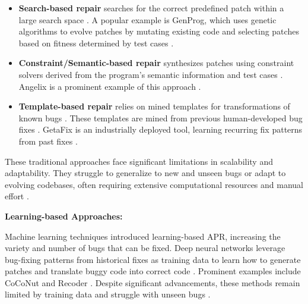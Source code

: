 \begin{itemize}
    \item \textbf{Search-based repair} searches for the correct predefined patch within a large search space \cite{liuMarsCodeAgentAInative2024, huCanGPTO1Kill2024, zhangPATCHEmpoweringLarge2025}. A popular example is GenProg, which uses genetic algorithms to evolve patches by mutating existing code and selecting patches based on fitness determined by test cases \cite{legouesGenProgGenericMethod2012}.

    \item \textbf{Constraint/Semantic-based repair} synthesizes patches using constraint solvers derived from the program's semantic information and test cases \cite{liuMarsCodeAgentAInative2024, mechtaevAngelixScalableMultiline2016}. Angelix is a prominent example of this approach \cite{mechtaevAngelixScalableMultiline2016}.

    \item \textbf{Template-based repair} relies on mined templates for transformations of known bugs \cite{xiaAutomatedProgramRepair2023}. These templates are mined from previous human-developed bug fixes \cite{xiaAutomatedProgramRepair2023, yinThinkRepairSelfDirectedAutomated2024}. GetaFix is an industrially deployed tool, learning recurring fix patterns from past fixes \cite{baderGetafixLearningFix2019}.
\end{itemize}

These traditional approaches face significant limitations in scalability and adaptability. They struggle to generalize to new and unseen bugs or adapt to evolving codebases, often requiring extensive computational resources and manual effort \cite{puvvadiCodingAgentsComprehensive2025, xiaAutomatedProgramRepair2024}.

\textbf{Learning-based Approaches:}

Machine learning techniques introduced learning-based APR, increasing the variety and number of bugs that can be fixed. Deep neural networks leverage bug-fixing patterns from historical fixes as training data to learn how to generate patches and translate buggy code into correct code \cite{xiaAutomatedProgramRepair2023, tangLargeLanguageModels2024}. Prominent examples include CoCoNut \cite{lutellierCoCoNuTCombiningContextaware2020} and Recoder \cite{zhuSyntaxguidedEditDecoder2021}. Despite significant advancements, these methods remain limited by training data and struggle with unseen bugs \cite{xiaLessTrainingMore2022}.

